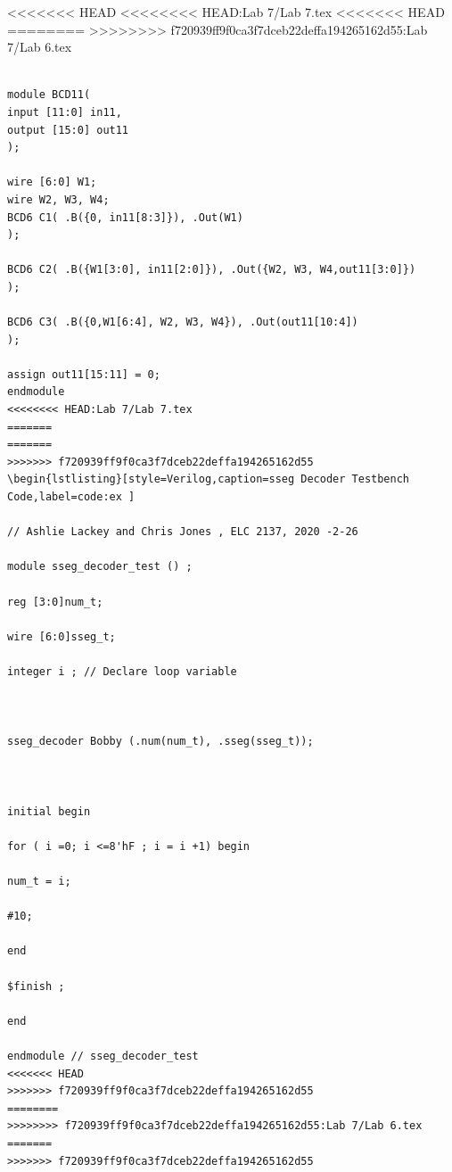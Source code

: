 \documentclass[11pt]{article}
\begin{document}
<<<<<<< HEAD
<<<<<<<< HEAD:Lab 7/Lab 7.tex
<<<<<<< HEAD
========
>>>>>>>> f720939ff9f0ca3f7dceb22deffa194265162d55:Lab 7/Lab 6.tex
\begin{lstlisting}[style=Verilog,caption=BCD11 Module Code,label=code:ex ]

module BCD11(
input [11:0] in11,
output [15:0] out11
);

wire [6:0] W1;
wire W2, W3, W4;
BCD6 C1( .B({0, in11[8:3]}), .Out(W1)
);

BCD6 C2( .B({W1[3:0], in11[2:0]}), .Out({W2, W3, W4,out11[3:0]})
);

BCD6 C3( .B({0,W1[6:4], W2, W3, W4}), .Out(out11[10:4])
);

assign out11[15:11] = 0;
endmodule
<<<<<<<< HEAD:Lab 7/Lab 7.tex
=======
=======
>>>>>>> f720939ff9f0ca3f7dceb22deffa194265162d55
\begin{lstlisting}[style=Verilog,caption=sseg Decoder Testbench Code,label=code:ex ]

// Ashlie Lackey and Chris Jones , ELC 2137, 2020 -2-26

module sseg_decoder_test () ;

reg [3:0]num_t;

wire [6:0]sseg_t;

integer i ; // Declare loop variable



sseg_decoder Bobby (.num(num_t), .sseg(sseg_t));



initial begin

for ( i =0; i <=8'hF ; i = i +1) begin

num_t = i;

#10;

end

$finish ;

end

endmodule // sseg_decoder_test
<<<<<<< HEAD
>>>>>>> f720939ff9f0ca3f7dceb22deffa194265162d55
========
>>>>>>>> f720939ff9f0ca3f7dceb22deffa194265162d55:Lab 7/Lab 6.tex
=======
>>>>>>> f720939ff9f0ca3f7dceb22deffa194265162d55

\end{lstlisting}
\end{document}
